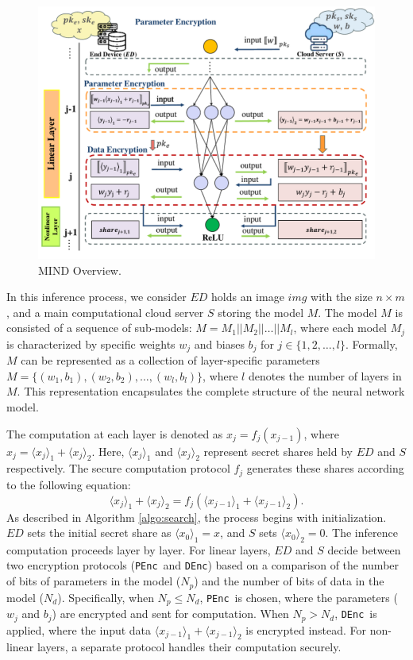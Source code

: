 \documentclass[conference]{IEEEtran}
\newcommand{\DEnc}{\texttt{DEnc}}
\newcommand{\PEnc}{\texttt{PEnc}}
\begin{document}
\begin{figure}[ht]
\centering
\includegraphics[scale=0.6]{fig3.pdf}
\caption{MIND Overview.} \label{fig:MIND Overview}
\end{figure}
In this inference process, we consider $ED$ holds an image $img$ with the size $n\times m$, and a main computational cloud server $S$ storing the model $M$. The model $M$ is consisted of a sequence of sub-models: $M=M_1 || M_2 || \dots || M_l$, where each model $M_j$ is characterized by specific weights $w_{j}$ and biases $b_{j}$ for $j \in \{1, 2, \dots, l\}$. Formally, $M$ can be represented as a collection of layer-specific parameters $M=\{(w_{1},b_{1}),(w_{2},b_{2}),\dots,(w_{l},b_{l})\}$, where $l$ denotes the number of layers in $M$. This representation encapsulates the complete structure of the neural network model.

The computation at each layer is denoted as $x_j = f_j(x_{j-1})$, where $x_j=\langle x_j \rangle_1 + \langle x_j \rangle_2$. Here, $\langle x_j \rangle_1$ and $\langle x_j \rangle_2$ represent secret shares held by $ED$ and $S$ respectively. The secure computation protocol $f_j$ generates these shares according to the following equation:
\begin{equation}
    \langle x_j \rangle_1+\langle x_j \rangle_2 = f_j(\langle x_{j-1} \rangle_1 + \langle x_{j-1} \rangle_2).
\end{equation}
As described in Algorithm \ref{algo:search}, the process begins with initialization. $ED$ sets the initial secret share as $\langle x_0 \rangle
_1=x$, and $S$ sets $\langle x_0 \rangle
_2=0$. The inference computation proceeds layer by layer. For linear layers, $ED$ and $S$ decide between two encryption protocols (\PEnc~and \DEnc) based on a comparison of the number of bits of parameters in the model ($N_p$) and the number of bits of data in the model ($N_d$). Specifically, when $N_p \leq N_d$, \PEnc~is chosen, where the parameters ($w_j$ and $b_j$) are encrypted and sent for computation. When $N_p > N_d$, \DEnc~is applied, where the input data $\langle x_{j-1} \rangle_1 + \langle x_{j-1} \rangle_2$ is encrypted instead. For non-linear layers, a separate protocol handles their computation securely.
\end{document}
